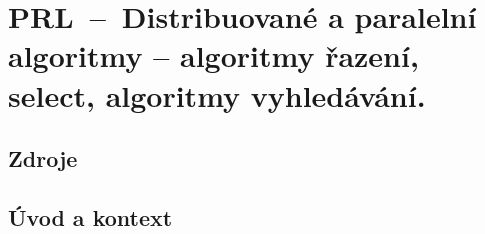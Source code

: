 

\graphicspath{{prl/paralelni_algoritmy_razeni_a_vyhledavani/figures}}


\chapter{PRL~--~Distribuované a paralelní algoritmy -- algoritmy řazení, select, algoritmy vyhledávání.}


\section{Zdroje}

\begin{compactitem}
    \item {}
\end{compactitem}


\section{Úvod a kontext}

\begin{compactitem}
    \item {}
\end{compactitem}

